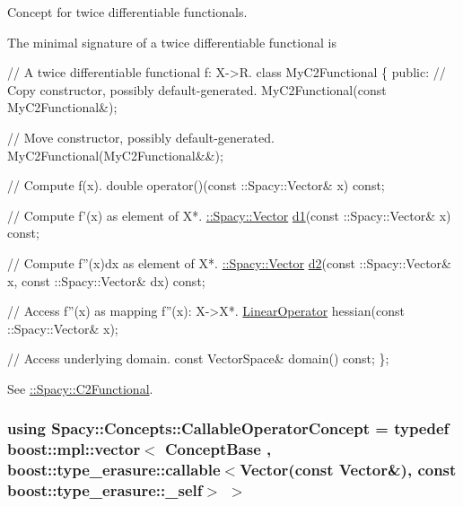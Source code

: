 Concept for twice differentiable functionals. 

\label{group__ConceptGroup_gafb4414561b07b27100cad81ecf152e47_C2FunctionalConceptAnchor}%
\hypertarget{group__ConceptGroup_gafb4414561b07b27100cad81ecf152e47_C2FunctionalConceptAnchor}{}%
The minimal signature of a twice differentiable functional is 
\begin{DoxyCode}
\textcolor{comment}{// A twice differentiable functional f: X->R.}
\textcolor{keyword}{class }MyC2Functional
\{
\textcolor{keyword}{public}:
  \textcolor{comment}{// Copy constructor, possibly default-generated.}
  MyC2Functional(\textcolor{keyword}{const} MyC2Functional&);

  \textcolor{comment}{// Move constructor, possibly default-generated.}
  MyC2Functional(MyC2Functional&&);

  \textcolor{comment}{// Compute f(x).}
  \textcolor{keywordtype}{double} operator()(const ::Spacy::Vector& x) \textcolor{keyword}{const};

  \textcolor{comment}{// Compute f'(x) as element of X*.}
  \hyperlink{classSpacy_1_1Vector}{::Spacy::Vector} \hyperlink{group__SpacyGroup_gab6646eb7068eb9f1369e639cf0b620a2_gab6646eb7068eb9f1369e639cf0b620a2}{d1}(const ::Spacy::Vector& x) \textcolor{keyword}{const};

  \textcolor{comment}{// Compute f''(x)dx as element of X*.}
  \hyperlink{classSpacy_1_1Vector}{::Spacy::Vector} \hyperlink{group__SpacyGroup_ga22f56f6ffd46496e786b435cabca71e0_ga22f56f6ffd46496e786b435cabca71e0}{d2}(const ::Spacy::Vector& x, const ::Spacy::Vector& dx) \textcolor{keyword}{const};

  \textcolor{comment}{// Access f''(x) as mapping f''(x): X->X*.}
  \hyperlink{group__SpacyGroup_ga584f7b9d82a844302ba0d77c3a1b6640_ga584f7b9d82a844302ba0d77c3a1b6640}{LinearOperator} hessian(const ::Spacy::Vector& x);

  \textcolor{comment}{// Access underlying domain.}
  \textcolor{keyword}{const} VectorSpace& domain() \textcolor{keyword}{const};
\};
\end{DoxyCode}


See \hyperlink{group__SpacyGroup_gaf5b89e117806134b06a1ce4629fb2b65_C2FunctionalAnchor}{\+:\+:Spacy\+:\+:C2\+Functional}. \hypertarget{group__ConceptGroup_gadec0c664abaacc2065dadd8b11cc8d30_gadec0c664abaacc2065dadd8b11cc8d30}{}
\subsubsection[{Callable\+Operator\+Concept}]{\setlength{\rightskip}{0pt plus 5cm}using {\bf Spacy\+::\+Concepts\+::\+Callable\+Operator\+Concept} = typedef boost\+::mpl\+::vector$<$ Concept\+Base , boost\+::type\+\_\+erasure\+::callable$<$Vector(const Vector\&), const boost\+::type\+\_\+erasure\+::\+\_\+self$>$ $>$}\label{group__ConceptGroup_gadec0c664abaacc2065dadd8b11cc8d30_gadec0c664abaacc2065dadd8b11cc8d30}


